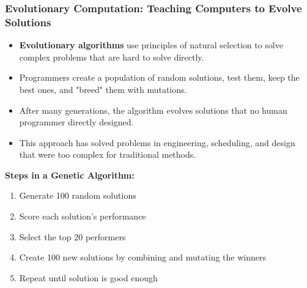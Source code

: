 \documentclass{beamer}
\begin{document}
	\begin{frame}
		\frametitle{Evolutionary Computation: Teaching Computers to Evolve Solutions}
		\begin{itemize}
			\item \textbf{Evolutionary algorithms} use principles of natural selection to solve complex problems that are hard to solve directly.
			\item Programmers create a population of random solutions, test them, keep the best ones, and "breed" them with mutations.
			\item After many generations, the algorithm evolves solutions that no human programmer directly designed.
			\item This approach has solved problems in engineering, scheduling, and design that were too complex for traditional methods.
		\end{itemize}
		\begin{example}
			\textbf{Steps in a Genetic Algorithm:}
			\scriptsize
			\begin{enumerate}
				\item Generate 100 random solutions
				\item Score each solution's performance
				\item Select the top 20 performers
				\item Create 100 new solutions by combining and mutating the winners
				\item Repeat until solution is good enough
			\end{enumerate}
		\end{example}
	\end{frame}
	
\end{document}
